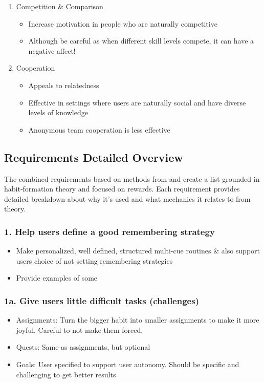 \begin{enumerate}
      \item Competition \& Comparison
      \begin{itemize}
        \item Increase motivation in people who are naturally competitive
        \item Although be careful as when different skill levels compete, it can have a negative affect!
      \end{itemize}

      \item Cooperation
      \begin{itemize}
        \item Appeals to relatedness
        \item Effective in settings where users are naturally social and have diverse levels of knowledge
        \item Anonymous team cooperation is less effective
      \end{itemize}

    \end{enumerate}

\subsection{Requirements Detailed Overview}

The combined requirements based on methods from \cite{article_beyond_self_tracking_designing_apps} and \cite{article_taxonomy_motivational_affordances_meaningful} create a list grounded in habit-formation theory and focused on rewards. Each requirement provides detailed breakdown about why it's used and what mechanics it relates to from theory.


\subsubsection*{1. Help users define a good remembering strategy}
  \begin{itemize}
    \item Make personalized, well defined, structured multi-cue routines \& also support users choice of not setting remembering strategies
    \item Provide examples of some
  \end{itemize}

\subsubsection*{1a. Give users little difficult tasks (challenges)}
  \begin{itemize}
    \item Assignments: Turn the bigger habit into smaller assignments to make it more joyful. Careful to not make them forced.
    \item Quests: Same as assignments, but optional
    \item Goals: User specified to support user autonomy. Should be specific and challenging to get better results
  \end{itemize}

